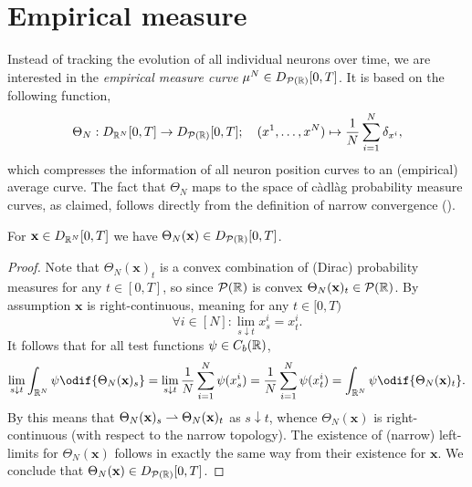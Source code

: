 \section{Empirical measure}

Instead of tracking the evolution of all individual neurons over time, we are interested in the \textit{empirical measure curve} \(\mu^N \in D_{\mathcal{P}(\mathbb{R})}[0,T]\).
It is based on the following function,
\begin{equation}
  \Theta_N : D_{\mathbb{R}^N}[0,T] \to D_{\mathcal{P}(\mathbb{R})}[0,T]; \quad (x^1,\dots,x^N) \mapsto \frac{1}{N} \sum_{i=1}^N \delta_{x^i},
\end{equation}
which compresses the information of all neuron position curves to an (empirical) average curve.
The fact that \(\Theta_N\) maps to the space of càdlàg probability measure curves, as claimed, follows directly from the definition of narrow convergence ().

\begin{lemma}\label{lem:range-of-Theta}
  For \(\mathbf{x} \in D_{\mathbb{R}^N}[0,T]\) we have \(\Theta_N(\mathbf{x}) \in D_{\mathcal{P}(\mathbb{R})}[0,T]\).
\end{lemma}

\begin{proof}
  Note that \(\Theta_N(\bm{x})_t\) is a convex combination of (Dirac) probability measures for any \(t \in [0,T]\), so since \(\mathcal{P}(\mathbb{R})\) is convex \(\Theta_N(\mathbf{x})_t \in \mathcal{P}(\mathbb{R})\).
  By assumption \(\bm{x}\) is right-continuous, meaning for any \(t \in [0,T)\)
  \begin{equation}
    \forall i \in [N] : \lim_{s \downarrow t} x_s^i = x_t^i.
  \end{equation}
  It follows that for all test functions \(\psi \in C_b(\mathbb{R})\),
  \begin{equation}
    \lim_{s \downarrow t} \int_{\potspace^N} \psi \odif{\Theta_N(\bm{x})_s}
    = \lim_{s \downarrow t} \frac{1}{N} \sum_{i=1}^N \psi(x_s^i)
    = \frac{1}{N} \sum_{i=1}^N \psi(x_t^i)
    = \int_{\potspace^N} \psi \odif{\Theta_N(\bm{x})_t}.
  \end{equation}
  By  this means that \(\Theta_N(\mathbf{x})_s \rightharpoonup \Theta_N(\mathbf{x})_t\) as \(s \downarrow t\), whence \(\Theta_N(\bm{x})\) is right-continuous (with respect to the narrow topology).
  The existence of (narrow) left-limits for \(\Theta_N(\bm{x})\) follows in exactly the same way from their existence for \(\bm{x}\).
  We conclude that \(\Theta_N(\mathbf{x}) \in D_{\mathcal{P}(\mathbb{R})}[0,T]\).
\end{proof}

